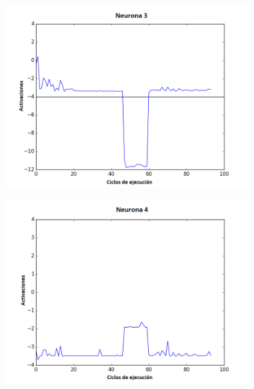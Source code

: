\begin{figure}[!h]
\begin{subfigure}{0.33\textwidth}
\end{subfigure}\hfil %
\begin{subfigure}{0.33\textwidth}
  \includegraphics[width=\linewidth]{Imagenes/Agente2Activaciones/Agente0/Neurona2}
\end{subfigure}
\medskip
\begin{subfigure}{0.33\textwidth}
  \includegraphics[width=\linewidth]{Imagenes/Agente2Activaciones/Agente0/Neurona3}
\end{subfigure}\hfil %
\begin{subfigure}{0.33\textwidth}

\end{subfigure}
\end{figure}
